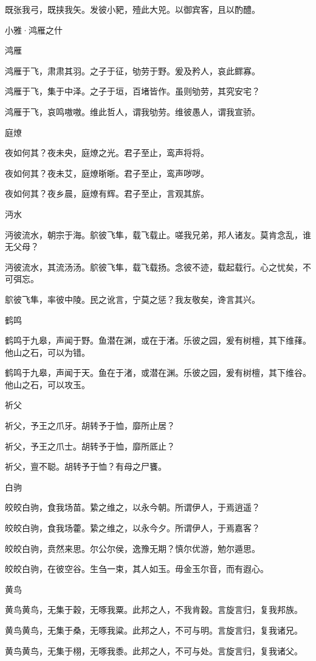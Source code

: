 既张我弓，既挟我矢。发彼小豝，殪此大兕。以御宾客，且以酌醴。




小雅·鸿雁之什


鸿雁

鸿雁于飞，肃肃其羽。之子于征，劬劳于野。爰及矜人，哀此鳏寡。

鸿雁于飞，集于中泽。之子于垣，百堵皆作。虽则劬劳，其究安宅？

鸿雁于飞，哀鸣嗷嗷。维此哲人，谓我劬劳。维彼愚人，谓我宣骄。

庭燎

夜如何其？夜未央，庭燎之光。君子至止，鸾声将将。

夜如何其？夜未艾，庭燎晣晣。君子至止，鸾声哕哕。

夜如何其？夜乡晨，庭燎有辉。君子至止，言观其旂。

沔水

沔彼流水，朝宗于海。鴥彼飞隼，载飞载止。嗟我兄弟，邦人诸友。莫肯念乱，谁无父母？

沔彼流水，其流汤汤。鴥彼飞隼，载飞载扬。念彼不迹，载起载行。心之忧矣，不可弭忘。

鴥彼飞隼，率彼中陵。民之讹言，宁莫之惩？我友敬矣，谗言其兴。

鹤鸣

鹤鸣于九皋，声闻于野。鱼潜在渊，或在于渚。乐彼之园，爰有树檀，其下维萚。他山之石，可以为错。

鹤鸣于九皋，声闻于天。鱼在于渚，或潜在渊。乐彼之园，爰有树檀，其下维谷。他山之石，可以攻玉。

祈父

祈父，予王之爪牙。胡转予于恤，靡所止居？

祈父，予王之爪士。胡转予于恤，靡所厎止？

祈父，亶不聪。胡转予于恤？有母之尸饔。

白驹

皎皎白驹，食我场苗。絷之维之，以永今朝。所谓伊人，于焉逍遥？

皎皎白驹，食我场藿。絷之维之，以永今夕。所谓伊人，于焉嘉客？

皎皎白驹，贲然来思。尔公尔侯，逸豫无期？慎尔优游，勉尔遁思。

皎皎白驹，在彼空谷。生刍一束，其人如玉。毋金玉尔音，而有遐心。

黄鸟

黄鸟黄鸟，无集于穀，无啄我粟。此邦之人，不我肯穀。言旋言归，复我邦族。

黄鸟黄鸟，无集于桑，无啄我粱。此邦之人，不可与明。言旋言归，复我诸兄。

黄鸟黄鸟，无集于栩，无啄我黍。此邦之人，不可与处。言旋言归，复我诸父。

